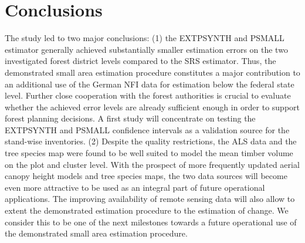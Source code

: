 \documentclass[remotesensing,article,accept,moreauthors,pdftex,10pt,a4paper]{Definitions/mdpi}
\newcommand{\psmall}{PSMALL}
\newcommand{\extpsynth}{EXTPSYNTH}
\begin{document}

\section{Conclusions}
\label{sec:concl}

The study led to two major conclusions: (1) the \extpsynth{} and \psmall{} estimator generally achieved substantially smaller estimation errors on the two investigated forest district levels compared to the SRS estimator. Thus, the demonstrated small area estimation procedure constitutes a major contribution to an additional use of the German NFI data for estimation below the federal state level. Further close cooperation with the forest authorities is crucial to evaluate whether the achieved error levels are already sufficient enough in order to support forest planning decisions. A first study will concentrate on testing the \extpsynth{} and \psmall{} confidence intervals as a validation source for the stand-wise inventories. (2) Despite the quality restrictions, the ALS data and the tree species map were found to be well suited to model the mean timber volume on the plot and cluster level. With the prospect of more frequently updated aerial canopy height models and tree species maps, the two data sources will become even more attractive to be used as an integral part of future operational applications. The improving availability of remote sensing data will also allow to extent the demonstrated estimation procedure to the estimation of change. We consider this to be one of the next milestones towards a future operational use of the demonstrated small area estimation procedure.




\vspace{6pt} 
%


%
\end{document}
